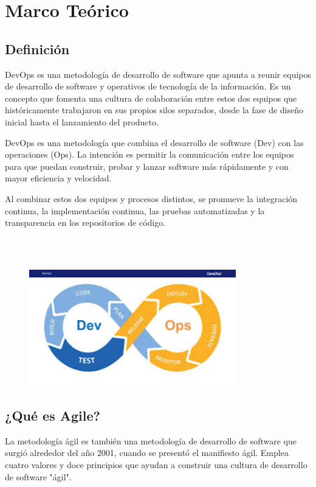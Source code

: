 \documentclass[preprint,12pt]{elsarticle}
\begin{document}
\section{Marco Teórico}

\subsection{Definición}

DevOps es una metodología de desarrollo de software que apunta a reunir equipos de desarrollo de software y operativos de tecnología de la información. Es un concepto que fomenta una cultura de colaboración entre estos dos equipos que históricamente trabajaron en sus propios silos separados, desde la fase de diseño inicial hasta el lanzamiento del producto.

DevOps es una metodología que combina el desarrollo de software (Dev) con las operaciones (Ops). La intención es permitir la comunicación entre los equipos para que puedan construir, probar y lanzar software más rápidamente y con mayor eficiencia y velocidad.

Al combinar estos dos equipos y procesos distintos, se promueve la integración continua, la implementación continua, las pruebas automatizadas y la transparencia en los repositorios de código.


\cite{DWarehouse02}
\\
\\

\begin{figure}[htb]
				\begin{center}
					\includegraphics[width=9cm]{./IMAGENES/definicionsql}
				\end{center}
			\end{figure}

\subsection{¿Qué es Agile?}
La metodología ágil es también una metodología de desarrollo de software que surgió alrededor del año 2001, cuando se presentó el manifiesto ágil. Emplea cuatro valores y doce principios que ayudan a construir una cultura de desarrollo de software "ágil".
\end{document}
